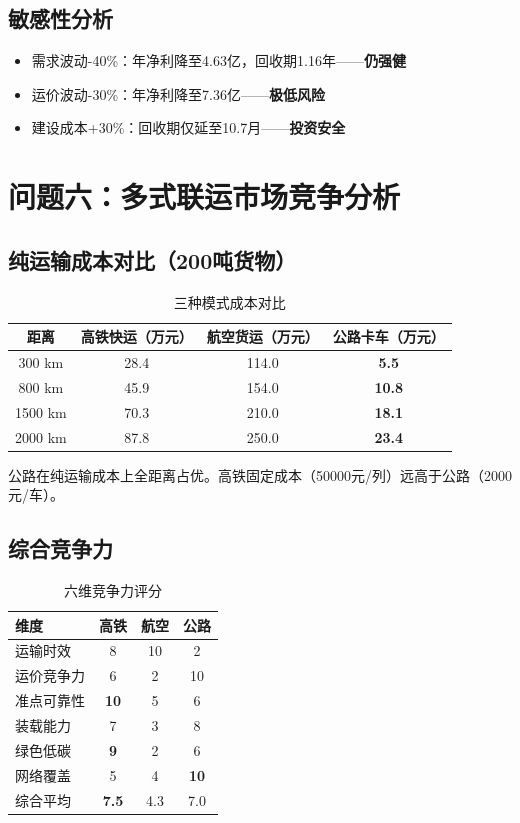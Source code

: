 \documentclass[12pt,a4paper,fontset=none]{ctexart}
\begin{document}
\subsection{敏感性分析}
\begin{itemize}
    \item 需求波动-40\%：年净利降至4.63亿，回收期1.16年——\textbf{仍强健}
    \item 运价波动-30\%：年净利降至7.36亿——\textbf{极低风险}
    \item 建设成本+30\%：回收期仅延至10.7月——\textbf{投资安全}
\end{itemize}

\section{问题六：多式联运市场竞争分析}

\subsection{纯运输成本对比（200吨货物）}

\begin{table}[H]\centering\small
\caption{三种模式成本对比}\label{tab:modes}
\begin{tabular}{cccc}
\toprule
距离 & 高铁快运（万元） & 航空货运（万元） & 公路卡车（万元） \\
\midrule
300 km & 28.4 & 114.0 & \cellcolor{green!10}\textbf{5.5} \\
800 km & 45.9 & 154.0 & \cellcolor{green!10}\textbf{10.8} \\
1500 km & 70.3 & 210.0 & \cellcolor{green!10}\textbf{18.1} \\
2000 km & 87.8 & 250.0 & \cellcolor{green!10}\textbf{23.4} \\
\bottomrule
\end{tabular}
\end{table}

公路在纯运输成本上全距离占优。高铁固定成本（50000元/列）远高于公路（2000元/车）。

\subsection{综合竞争力}

\begin{table}[H]\centering\small
\caption{六维竞争力评分}\label{tab:radar}
\begin{tabular}{lccc}
\toprule
维度 & 高铁 & 航空 & 公路 \\
\midrule
运输时效 & 8 & 10 & 2 \\
运价竞争力 & 6 & 2 & 10 \\
准点可靠性 & \textbf{10} & 5 & 6 \\
装载能力 & 7 & 3 & 8 \\
绿色低碳 & \textbf{9} & 2 & 6 \\
网络覆盖 & 5 & 4 & \textbf{10} \\
\midrule
综合平均 & \textbf{7.5} & 4.3 & 7.0 \\
\bottomrule
\end{tabular}
\end{table}
\end{document}
